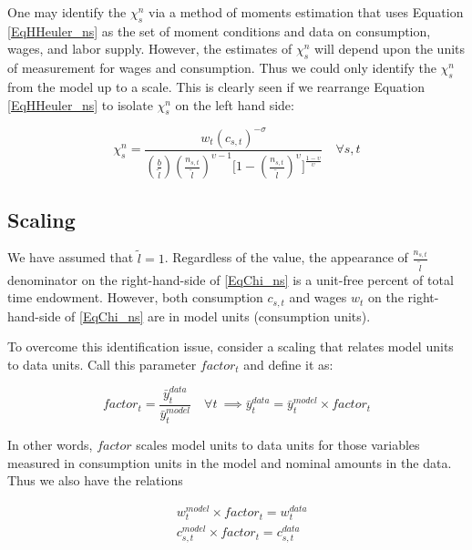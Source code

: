 \documentclass[letterpaper,12pt]{article}
\theoremstyle{definition}
\begin{document}
  One may identify the $\chi^{n}_{s}$ via a method of moments estimation that uses Equation \ref{EqHHeuler_ns} as the set of moment conditions and data on consumption, wages, and labor supply.  However, the estimates of $\chi^{n}_{s}$ will depend upon the units of measurement for wages and consumption.  Thus we could only identify the $\chi^{n}_{s}$ from the model up to a scale.  This is clearly seen if we rearrange Equation \ref{EqHHeuler_ns} to isolate $\chi^{n}_{s}$ on the left hand side:

  \begin{equation}\label{EqChi_ns}
    \chi^n_s = \frac{w_t\left(c_{s,t}\right)^{-\sigma}}{\left(\frac{b}{\tilde{l}}\right)\left(\frac{n_{s,t}}{\tilde{l}}\right)^{\upsilon-1}\Biggl[1 - \left(\frac{n_{s,t}}{\tilde{l}}\right)^\upsilon\Biggr]^{\frac{1-\upsilon}{\upsilon}}} \quad\forall s, t
  \end{equation}


  \subsection{Scaling}

    We have assumed that $\tilde{l}=1$. Regardless of the value, the appearance of $\frac{n_{s,t}}{\tilde{l}}$ denominator on the right-hand-side of \eqref{EqChi_ns} is a unit-free percent of total time endowment. However, both consumption $c_{s,t}$ and wages $w_t$ on the right-hand-side of \eqref{EqChi_ns} are in model units (consumption units).

    To overcome this identification issue, consider a scaling that relates model units to data units.  Call this parameter $factor_t$ and define it as:

    \begin{equation}\label{EqDataModelIncome}
      factor_t = \frac{\bar{y}^{data}_t}{\bar{y}^{model}_t} \quad\forall t \ \implies \bar{y}^{data}_t = \bar{y}^{model}_t \times factor_t
    \end{equation}

    In other words, $factor$ scales model units to data units for those variables measured in consumption units in the model and nominal amounts in the data.  Thus we also have the relations

    \begin{equation}
      \begin{split}
        & w^{model}_{t} \times factor_{t} = w^{data}_{t} \\
        & c^{model}_{s,t} \times factor_{t} = c^{data}_{s,t}
      \end{split}
    \end{equation}
\end{document}
